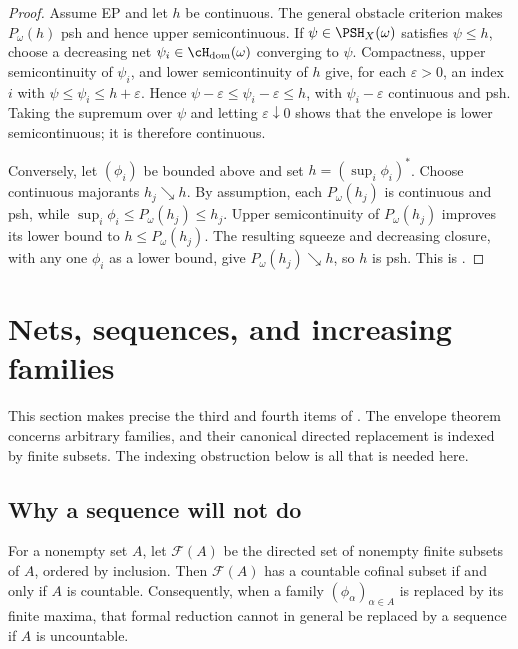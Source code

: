 \begin{proof}
Assume EP and let $h$ be continuous.  The general obstacle criterion makes
$P_\omega(h)$ psh and hence upper semicontinuous.  If
$\psi\in\PSH_X(\omega)$ satisfies $\psi\leq h$, choose a decreasing net
$\psi_i\in\cH_{\mathrm{dom}}(\omega)$ converging to $\psi$.  Compactness,
upper semicontinuity of $\psi_i$, and lower semicontinuity of $h$ give,
for each $\varepsilon>0$, an index $i$ with
$\psi\leq\psi_i\leq h+\varepsilon$.  Hence
$\psi-\varepsilon\leq\psi_i-\varepsilon\leq h$, with
$\psi_i-\varepsilon$ continuous and psh.  Taking the supremum over
$\psi$ and letting $\varepsilon\downarrow0$ shows that the envelope is
lower semicontinuous; it is therefore continuous.

Conversely, let $(\phi_i)$ be bounded above and set
$h=(\sup_i\phi_i)^*$.  Choose continuous majorants $h_j\searrow h$.
By assumption, each $P_\omega(h_j)$ is continuous and psh, while
$\sup_i\phi_i\leq P_\omega(h_j)\leq h_j$.  Upper semicontinuity of $P_\omega(h_j)$ improves its lower bound to
$h\leq P_\omega(h_j)$. The resulting squeeze and decreasing closure,
with any one $\phi_i$ as a lower bound, give
$P_\omega(h_j)\searrow h$, so $h$ is psh.
This is \cite[Lemma~5.17]{BJ22}.
\end{proof}


\section{Nets, sequences, and increasing families}
\label{sec:ch36-nets}

This section makes precise the third and fourth items of
.  The envelope theorem concerns arbitrary
families, and their canonical directed replacement is indexed by finite
subsets.  The indexing obstruction below is all that is needed here.

\subsection{Why a sequence will not do}

\begin{proposition}
\label{prop:ch36-no-sequences}
For a nonempty set $A$, let $\mathcal F(A)$ be the directed set of nonempty finite
subsets of $A$, ordered by inclusion.  Then $\mathcal F(A)$ has a
countable cofinal subset if and only if $A$ is countable.  Consequently,
when a family $(\phi_\alpha)_{\alpha\in A}$ is replaced by its finite
maxima, that formal reduction cannot in general be replaced by a sequence if
$A$ is uncountable.
\end{proposition}

